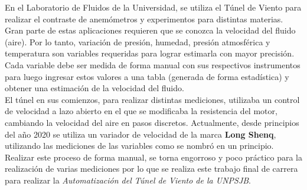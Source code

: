En el Laboratorio de Fluidos de la Universidad, se utiliza el Túnel de Viento para realizar el contraste de anemómetros y experimentos para distintas materias. Gran parte de estas aplicaciones requieren que se conozca la velocidad del fluido (aire). Por lo tanto, variación de presión, humedad, presión atmosférica y temperatura son variables requeridas para lograr estimarla con mayor precisión.
Cada variable debe ser medida de forma manual con sus respectivos instrumentos para luego ingresar estos valores a una tabla (generada de forma estadística) y obtener una estimación de la velocidad del fluido.\\

El túnel en sus comienzos, para realizar distintas mediciones, utilizaba un control de velocidad a lazo abierto en el que se modificaba la resistencia del motor, cambiando la velocidad del aire en pasos discretos. Actualmente, desde principios del año 2020 se utiliza un variador de velocidad de la marca \textbf{Long Shenq}, utilizando las mediciones de las variables como se nombró en un principio.\\

Realizar este proceso de forma manual, se torna engorroso y poco práctico para la realización de varias mediciones por lo que se realiza este trabajo final de carrera para realizar la \textit{Automatización del Túnel de Viento de la UNPSJB}.

\newpage